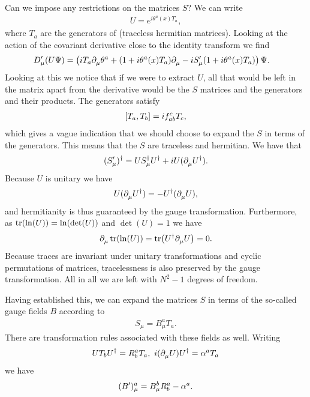 Can we impose any restrictions on the matrices $S$? We can write
\begin{align*}
	U = e^{i\theta^{a}(x)T_{a}},
\end{align*}
where $T_{a}$ are the generators of  (traceless hermitian matrices). Looking at the action of the covariant derivative close to the identity transform we find
\begin{align*}
	D_{\mu}^{\prime}(U\Psi) &= \left(iT_{a}\partial^{}_{\mu}\theta^{a} + (1 + i\theta^{a}(x)T_{a})\partial^{}_{\mu} - iS_{\mu}^{\prime}(1 + i\theta^{a}(x)T_{a})\right)\Psi.
\end{align*}
Looking at this we notice that if we were to extract $U$, all that would be left in the matrix apart from the derivative would be the $S$ matrices and the generators and their products. The generators satisfy
\begin{align*}
	\comm{T_{a}}{T_{b}} = if_{ab}^{c}T_{c},
\end{align*}
which gives a vague indication that we should choose to expand the $S$ in terms of the generators. This means that the $S$ are traceless and hermitian. We have that
\begin{align*}
	(S_{\mu}^{\prime})^{\dagger} = US_{\mu}^{\dagger} U^{\dagger} + iU(\partial^{}_{\mu}U^{\dagger}).
\end{align*}
Because $U$ is unitary we have
\begin{align*}
	U(\partial^{}_{\mu}U^{\dagger}) = -U^{\dagger}(\partial^{}_{\mu}U),
\end{align*}
and hermitianity is thus guaranteed by the gauge transformation. Furthermore, as $\tr(\ln(U)) = \ln(\det(U))$ and $\det(U) = 1$ we have
\begin{align*}
	\partial^{}_{\mu}\tr(\ln(U)) = \tr(U^{\dagger}\partial^{}_{\mu}U) = 0.
\end{align*}
Because traces are invariant under unitary transformations and cyclic permutations of matrices, tracelessness is also preserved by the gauge transformation. All in all we are left with $N^{2} - 1$ degrees of freedom.

Having established this, we can expand the matrices $S$ in terms of the so-called gauge fields $B$ according to
\begin{align*}
	S_{\mu} = B_{\mu}^{a}T_{a}.
\end{align*}
There are transformation rules associated with these fields as well. Writing
\begin{align*}
	UT_{b}U^{\dagger} = R_{b}^{a}T_{a},\ i(\partial^{}_{\mu}U)U^{\dagger} = \alpha^{a}T_{a}
\end{align*}
we have
\begin{align*}
	(B^{\prime})_{\mu}^{a} = B_{\mu}^{b}R_{b}^{a} - \alpha^{a}.
\end{align*}


